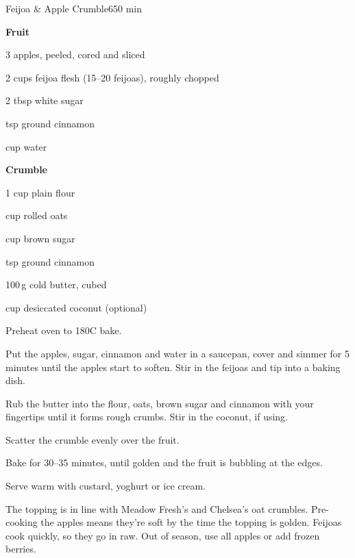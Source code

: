 \begin{recipebox}{Feijoa \& Apple Crumble}{6}{50 min}
\begin{ingredients}
  \item[] \textbf{Fruit}
  \item 3 apples, peeled, cored and sliced
  \item 2 cups feijoa flesh (15--20 feijoas), roughly chopped
  \item 2 tbsp white sugar
  \item {} tsp ground cinnamon
  \item {} cup water
  \item[] \textbf{Crumble}
  \item 1 cup plain flour
  \item {} cup rolled oats
  \item {} cup brown sugar
  \item {} tsp ground cinnamon
  \item 100\,g cold butter, cubed
  \item {} cup desiccated coconut (optional)
\end{ingredients}

\begin{method}
  \item Preheat oven to 180\degree C bake.
  \item Put the apples, sugar, cinnamon and water in a saucepan, cover and simmer for 5 minutes until the apples start to soften. Stir in the feijoas and tip into a baking dish.
  \item Rub the butter into the flour, oats, brown sugar and cinnamon with your fingertips until it forms rough crumbs. Stir in the coconut, if using.
  \item Scatter the crumble evenly over the fruit.
  \item Bake for 30--35 minutes, until golden and the fruit is bubbling at the edges.
  \item Serve warm with custard, yoghurt or ice cream.
\end{method}

\begin{notes}
The topping is in line with Meadow Fresh's and Chelsea's oat crumbles. Pre-cooking the apples means they're soft by the time the topping is golden. Feijoas cook quickly, so they go in raw.
Out of season, use all apples or add frozen berries.
\end{notes}
\end{recipebox}
